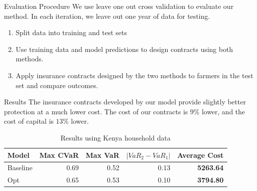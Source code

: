 \documentclass{beamer}
\begin{document}
\begin{frame}{Evaluation Procedure}
We use leave one out cross validation to evaluate our method. In each iteration, we leave out one year of data for testing.
\begin{enumerate}
    \item Split data into training and test sets 
    \item Use training data and model predictions to design contracts using both methods.
    \item Apply insurance contracts designed by the two methods to farmers in the test set and compare outcomes.
\end{enumerate}
\end{frame}

\begin{frame}{Results}
The insurance contracts developed by our model provide slightly better protection at a much lower cost. The cost of our contracts is $9\%$ lower, and the cost of capital is $13\%$ lower. 
\begin{table}[]
\small
    \centering

\begin{tabular}{lrrrr}
    \toprule
       Model &  Max CVaR &  Max VaR &  $|VaR_2 - VaR_1|$ &  Average Cost \\
    \midrule
    Baseline &      0.69 &     0.52 &               0.13 &       \textbf{5263.64} \\
         Opt &      0.65 &     0.53 &               0.10 &       \textbf{3794.80} \\
    \bottomrule
    \end{tabular}
    \caption{Results using Kenya household data}
    
\end{table}
\end{frame}
\end{document}

